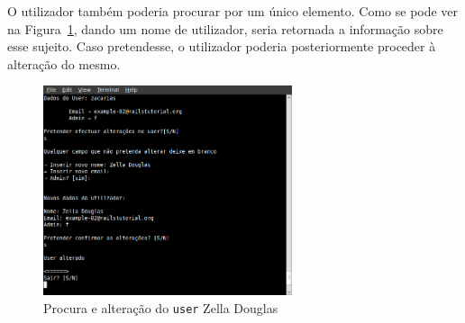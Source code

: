 O utilizador também poderia procurar por um único elemento. Como se pode ver na Figura~\ref{img:zelladouglas}, dando um nome de utilizador, 
seria retornada a informação sobre esse sujeito. Caso pretendesse, o utilizador poderia posteriormente proceder à alteração do mesmo.\\

\begin{figure}[H]
\begin{center}
\includegraphics[width=0.65\textwidth]{Images/zacarias}
\caption{Procura e alteração do \texttt{user} Zella Douglas}\label{img:zelladouglas}
\end{center}
\end{figure} 

